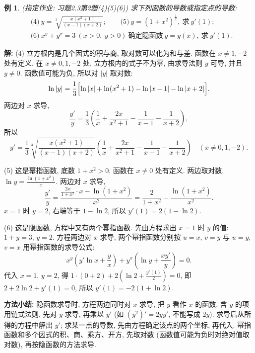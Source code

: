 \documentclass[UTF8,openany]{ctexbook}
\theoremstyle{chinesetextbook}
\newtheorem{example}{例}[section]
\newenvironment{cnsolution}{\par\indent\textbf{解:} \ignorespaces}{\par}
\begin{document}
\begin{example}\label{ex:c2-h3-2}
\textnormal{(指定作业: 习题2.3第2题(4)(5)(6))} 求下列函数的导数或指定点的导数:
\[
\begin{aligned}
&\text{(4)}\ y=\sqrt[3]{\frac{x(x^2+1)}{(x-1)(x+2)}};\qquad\text{(5)}\ y=(1+x^2)^{\frac1x},\ \text{求}\ y'(1);\\
&\text{(6)}\ x^y+y^x=3\ (x>0,\ y>0)\ \text{确定隐函数}\ y=y(x),\ \text{求}\ y'(1).
\end{aligned}
\]
\end{example}
\begin{cnsolution}
(4) 立方根内是几个因式的积与商, 取对数可以化为和与差. 函数在 $x\ne1,-2$ 处有定义. 在 $x\ne0,1,-2$ 处, 立方根内的式子不为零, 由求导法则 $y$ 可导, 并且 $y\ne0$. 函数值可能为负, 所以对 $|y|$ 取对数:
\[
\ln|y|=\frac13\Bigl[\ln|x|+\ln(x^2+1)-\ln|x-1|-\ln|x+2|\Bigr].
\]
两边对 $x$ 求导,
\[
\frac{y'}y=\frac13\left(\frac1x+\frac{2x}{x^2+1}-\frac1{x-1}-\frac1{x+2}\right),
\]
所以
\[
y'=\frac13\sqrt[3]{\frac{x(x^2+1)}{(x-1)(x+2)}}\left(\frac1x+\frac{2x}{x^2+1}-\frac1{x-1}-\frac1{x+2}\right)\quad(x\ne0,1,-2).
\]

(5) 这是幂指函数, 底数 $1+x^2>0$, 函数在 $x\ne0$ 处有定义. 两边取对数, $\displaystyle\ln y=\frac{\ln(1+x^2)}x$. 两边对 $x$ 求导,
\[
\frac{y'}y=\frac{\frac{2x}{1+x^2}\cdot x-\ln(1+x^2)}{x^2}=\frac2{1+x^2}-\frac{\ln(1+x^2)}{x^2}.
\]
$x=1$ 时 $y=2$, 右端等于 $1-\ln2$, 所以 $y'(1)=2(1-\ln2)$.

(6) 这是隐函数, 方程中又有两个幂指函数. 先由方程求出 $x=1$ 时 $y$ 的值: $1+y=3$, $y=2$. 方程两边对 $x$ 求导, 两个幂指函数分别按 $u=x$, $v=y$ 与 $u=y$, $v=x$ 用幂指函数的求导公式:
\[
x^y\left(y'\ln x+\frac yx\right)+y^x\left(\ln y+\frac{xy'}y\right)=0.
\]
代入 $x=1$, $y=2$, 得 $\displaystyle1\cdot(0+2)+2\left(\ln2+\frac{y'(1)}2\right)=0$, 即 $2+2\ln2+y'(1)=0$, 所以 $y'(1)=-2(1+\ln2)$.
\end{cnsolution}
\par\indent\textbf{方法小结:} 隐函数求导时, 方程两边同时对 $x$ 求导, 把 $y$ 看作 $x$ 的函数. 含 $y$ 的项用链式法则, 先对 $y$ 求导, 再乘以 $y'$ (如 $(y^2)'=2yy'$, 不能写成 $2y$). 求导后从所得的方程中解出 $y'$; 求某一点的导数, 先由方程确定该点的两个坐标, 再代入. 幂指函数和多个因式的积、商、乘方、开方, 先取对数 (函数值可能为负时对绝对值取对数), 再按隐函数的方法求导.
\end{document}
